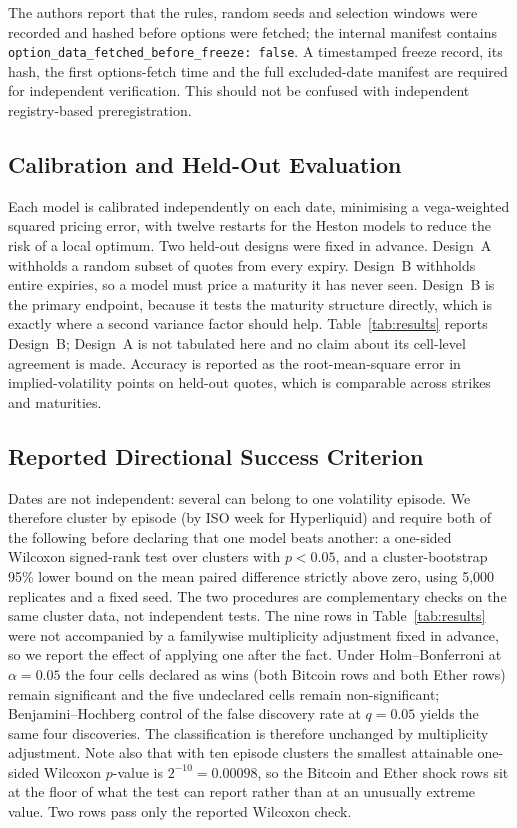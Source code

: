 \documentclass[runningheads]{llncs}
\begin{document}
The authors report that the rules, random seeds and selection windows
were recorded and hashed before options were fetched; the internal
manifest contains
\texttt{option\_data\_fetched\_before\_freeze:\ false}. A timestamped
freeze record, its hash, the first options-fetch time and the full
excluded-date manifest are required for independent verification. This
should not be confused with independent registry-based preregistration.

\subsection{Calibration and Held-Out Evaluation}
\label{sec:calibration}

Each model is calibrated independently on each date, minimising a
vega-weighted squared pricing error, with twelve restarts for the Heston
models to reduce the risk of a local optimum. Two held-out designs were
fixed in advance. Design~A withholds a random subset of quotes from
every expiry. Design~B withholds entire expiries, so a model must price
a maturity it has never seen. Design~B is the primary endpoint, because
it tests the maturity structure directly, which is exactly where a
second variance factor should help. Table~\ref{tab:results} reports
Design~B; Design~A is not tabulated here and no claim about its
cell-level agreement is made. Accuracy is reported as the
root-mean-square error in implied-volatility points on held-out quotes,
which is comparable across strikes and maturities.

\subsection{Reported Directional Success Criterion}
\label{sec:criterion}

Dates are not independent: several can belong to one volatility episode.
We therefore cluster by episode (by ISO week for Hyperliquid) and
require both of the following before declaring that one model beats
another: a one-sided Wilcoxon signed-rank test over clusters with
$p < 0.05$, and a cluster-bootstrap 95\% lower bound on the mean paired
difference strictly above zero, using 5,000 replicates and a fixed seed.
The two procedures are complementary checks on the same cluster data,
not independent tests. The nine rows in Table~\ref{tab:results} were not accompanied by a
familywise multiplicity adjustment fixed in advance, so we report the effect
of applying one after the fact. Under Holm--Bonferroni at $\alpha=0.05$ the
four cells declared as wins (both Bitcoin rows and both Ether rows) remain
significant and the five undeclared cells remain non-significant;
Benjamini--Hochberg control of the false discovery rate at $q=0.05$ yields the
same four discoveries. The classification is therefore unchanged by
multiplicity adjustment. Note also that with ten episode clusters the smallest
attainable one-sided Wilcoxon $p$-value is $2^{-10}=0.00098$, so the Bitcoin
and Ether shock rows sit at the floor of what the test can report rather than
at an unusually extreme value. Two rows pass only the reported Wilcoxon
check.
\end{document}

